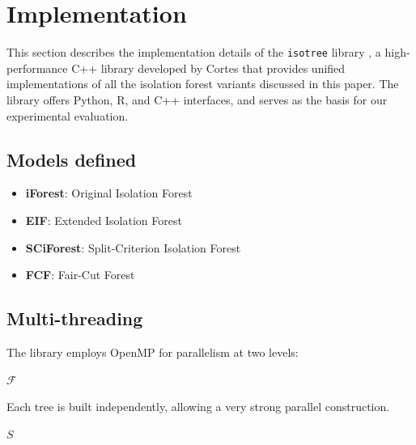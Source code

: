 
\section{Implementation}

This section describes the implementation details of the \texttt{isotree} library \cite{cortes2023package}, a high-performance C++ library developed by Cortes that provides unified implementations of all the isolation forest variants discussed in this paper. The library offers Python, R, and C++ interfaces, and serves as the basis for our experimental evaluation.

\subsection{Models defined}
\begin{itemize}
    \item \textbf{iForest}: Original Isolation Forest \cite{liu2008isolation}
    \item \textbf{EIF}: Extended Isolation Forest \cite{hariri2019extended}
    \item \textbf{SCiForest}: Split-Criterion Isolation Forest \cite{liu2010detecting}
    \item \textbf{FCF}: Fair-Cut Forest \cite{cortes2021revisiting}
\end{itemize}

\subsection{Multi-threading}

The library employs OpenMP for parallelism at two levels:

\begin{algorithm}[t]
\caption{Tree-level Parallelism}
\label{alg:tree-parallel}
\DontPrintSemicolon
{}
\medskip
{}
\Return $\mathcal{F}$
\end{algorithm}

Each tree is built independently, allowing a very strong parallel construction.

\begin{algorithm}[t]
\caption{Prediction Parallelism}
\label{alg:pred-parallel}
\DontPrintSemicolon
{}
\medskip
{}
\Return $S$
\end{algorithm}

